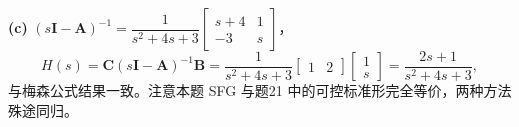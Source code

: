\documentclass[11pt,a4paper]{ctexart}
\begin{document}
\textbf{(c)}
$(s\mathbf{I}-\mathbf{A})^{-1}=\dfrac{1}{s^2+4s+3}\begin{bmatrix}s+4&1\\-3&s\end{bmatrix}$，
\[
H(s)=\mathbf{C}(s\mathbf{I}-\mathbf{A})^{-1}\mathbf{B}
     =\frac{1}{s^2+4s+3}\begin{bmatrix}1&2\end{bmatrix}\begin{bmatrix}1\\s\end{bmatrix}
     =\frac{2s+1}{s^2+4s+3},
\]
与梅森公式结果一致。注意本题 SFG 与题21 中的可控标准形完全等价，两种方法殊途同归。
\end{document}
